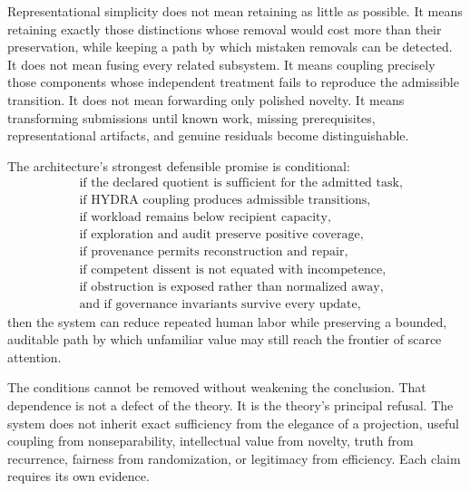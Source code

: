 \documentclass[11pt]{article}
\theoremstyle{definition}
\begin{document}
Representational simplicity does not mean retaining as little as possible. It means retaining exactly those distinctions whose removal would cost more than their preservation, while keeping a path by which mistaken removals can be detected. It does not mean fusing every related subsystem. It means coupling precisely those components whose independent treatment fails to reproduce the admissible transition. It does not mean forwarding only polished novelty. It means transforming submissions until known work, missing prerequisites, representational artifacts, and genuine residuals become distinguishable.

The architecture's strongest defensible promise is conditional:
\[
\begin{aligned}
&
\text{if the declared quotient is sufficient for the admitted task,}
\\
&
\text{if HYDRA coupling produces admissible transitions,}
\\
&
\text{if workload remains below recipient capacity,}
\\
&
\text{if exploration and audit preserve positive coverage,}
\\
&
\text{if provenance permits reconstruction and repair,}
\\
&
\text{if competent dissent is not equated with incompetence,}
\\
&
\text{if obstruction is exposed rather than normalized away,}
\\
&
\text{and if governance invariants survive every update,}
\end{aligned}
\]
then the system can reduce repeated human labor while preserving a bounded, auditable path by which unfamiliar value may still reach the frontier of scarce attention.

The conditions cannot be removed without weakening the conclusion. That dependence is not a defect of the theory. It is the theory's principal refusal. The system does not inherit exact sufficiency from the elegance of a projection, useful coupling from nonseparability, intellectual value from novelty, truth from recurrence, fairness from randomization, or legitimacy from efficiency. Each claim requires its own evidence.
\end{document}
